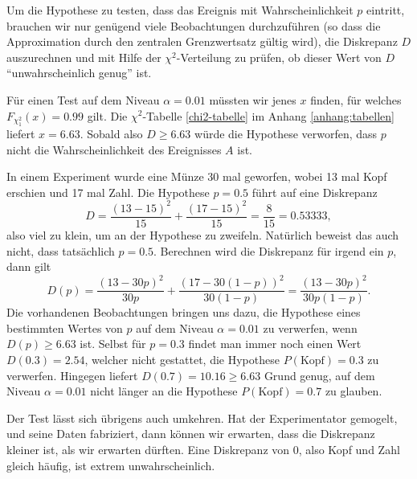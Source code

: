 Um die Hypothese zu testen, dass das Ereignis mit Wahrscheinlichkeit $p$
eintritt, brauchen wir nur genügend viele Beobachtungen durchzuführen
(so dass die Approximation durch den zentralen Grenzwertsatz gültig wird),
die Diskrepanz $D$ auszurechnen und mit Hilfe der $\chi^2$-Verteilung
zu prüfen, ob dieser Wert von $D$ ``unwahrscheinlich genug'' ist.

Für einen Test auf dem Niveau $\alpha=0.01$ müssten wir jenes
$x$ finden, für welches $F_{\chi^2_1}(x)=0.99$ gilt.
Die $\chi^2$-Tabelle \ref{chi2-tabelle} im Anhang \ref{anhang:tabellen}
liefert $x=6.63$.
Sobald also $D\ge 6.63$ würde die Hypothese verworfen,
dass $p$ nicht die Wahrscheinlichkeit des Ereignisses $A$ ist.

In einem Experiment wurde eine Münze 30 mal geworfen, wobei 13 mal
Kopf erschien und 17 mal Zahl.
Die Hypothese $p=0.5$ führt auf eine
Diskrepanz 
\[
D=\frac{(13-15)^2}{15}+\frac{(17-15)^2}{15}=\frac{8}{15}=0.53333,
\]
also viel zu klein, um an der Hypothese zu zweifeln.
Natürlich beweist das auch nicht, dass tatsächlich $p=0.5$.
Berechnen wird die Diskrepanz für irgend ein $p$, dann gilt
\[
D(p)=\frac{(13-30p)^2}{30p}+\frac{(17-30(1-p))^2}{30(1-p)}
=\frac{(13-30p)^2}{30p(1-p)}.
\]
Die vorhandenen Beobachtungen bringen uns dazu, die Hypothese eines
bestimmten Wertes von $p$ auf dem Niveau $\alpha=0.01$ zu verwerfen,
wenn $D(p)\ge 6.63$ ist.
Selbst für $p=0.3$ findet man immer noch einen
Wert $D(0.3)=2.54$, welcher nicht gestattet,
die Hypothese $P(\text{Kopf})=0.3$ zu verwerfen.
Hingegen liefert 
$D(0.7)=10.16\ge 6.63$ Grund genug, auf dem Niveau $\alpha=0.01$ nicht
länger an die Hypothese $P(\text{Kopf})=0.7$ zu glauben.

Der Test lässt sich übrigens auch umkehren.
Hat der Experimentator
gemogelt, und seine Daten fabriziert, dann können wir erwarten, dass
die Diskrepanz kleiner ist, als wir erwarten dürften.
Eine Diskrepanz
von $0$, also Kopf und Zahl gleich häufig, ist extrem unwahrscheinlich.

